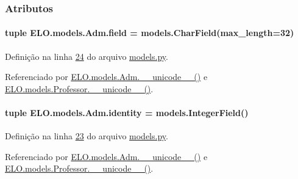 \subsubsection{Atributos}
\hypertarget{classELO_1_1models_1_1Adm_ae1af4ca22491b1cfe9cb0a7acefaa71e}{
\paragraph[{field}]{\setlength{\rightskip}{0pt plus 5cm}tuple E\-L\-O.\-models.\-Adm.\-field = models.\-Char\-Field(max\-\_\-length=32)\hspace{0.3cm}{\ttfamily [static]}}}\label{classELO_1_1models_1_1Adm_ae1af4ca22491b1cfe9cb0a7acefaa71e}


Definição na linha \hyperlink{ELO_2models_8py_source_l00024}{24} do arquivo \hyperlink{ELO_2models_8py_source}{models.\-py}.



Referenciado por \hyperlink{classELO_1_1models_1_1Adm_a3541c3ae12b8d2da3f44ac6be00a23e6}{E\-L\-O.\-models.\-Adm.\-\_\-\-\_\-unicode\-\_\-\-\_\-()} e \hyperlink{classELO_1_1models_1_1Professor_aefc9d63d429e19ec3487a7879879f29d}{E\-L\-O.\-models.\-Professor.\-\_\-\-\_\-unicode\-\_\-\-\_\-()}.

\hypertarget{classELO_1_1models_1_1Adm_af7e7b797ce5d3396e8a54d8927450d75}{
\paragraph[{identity}]{\setlength{\rightskip}{0pt plus 5cm}tuple E\-L\-O.\-models.\-Adm.\-identity = models.\-Integer\-Field()\hspace{0.3cm}{\ttfamily [static]}}}\label{classELO_1_1models_1_1Adm_af7e7b797ce5d3396e8a54d8927450d75}


Definição na linha \hyperlink{ELO_2models_8py_source_l00023}{23} do arquivo \hyperlink{ELO_2models_8py_source}{models.\-py}.



Referenciado por \hyperlink{classELO_1_1models_1_1Adm_a3541c3ae12b8d2da3f44ac6be00a23e6}{E\-L\-O.\-models.\-Adm.\-\_\-\-\_\-unicode\-\_\-\-\_\-()} e \hyperlink{classELO_1_1models_1_1Professor_aefc9d63d429e19ec3487a7879879f29d}{E\-L\-O.\-models.\-Professor.\-\_\-\-\_\-unicode\-\_\-\-\_\-()}.

